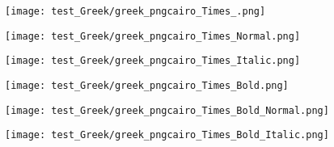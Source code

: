 \documentclass{ltjsarticle}
\begin{document}
			\begin{figure}[ht]
				\centering
				\begin{minipage}{0.3\columnwidth}
					\texttt{[image: test\_Greek/greek\_pngcairo\_Times\_.png]}
				\end{minipage}
				\begin{minipage}{0.3\columnwidth}
					\texttt{[image: test\_Greek/greek\_pngcairo\_Times\_Normal.png]}
				\end{minipage}
				\begin{minipage}{0.3\columnwidth}
					\texttt{[image: test\_Greek/greek\_pngcairo\_Times\_Italic.png]}
				\end{minipage}
				\begin{minipage}{0.3\columnwidth}
					\texttt{[image: test\_Greek/greek\_pngcairo\_Times\_Bold.png]}
				\end{minipage}
				\begin{minipage}{0.3\columnwidth}
					\texttt{[image: test\_Greek/greek\_pngcairo\_Times\_Bold\_Normal.png]}
				\end{minipage}
				\begin{minipage}{0.3\columnwidth}
					\texttt{[image: test\_Greek/greek\_pngcairo\_Times\_Bold\_Italic.png]}
				\end{minipage}
			\end{figure}
			\clearpage%
\end{document}
